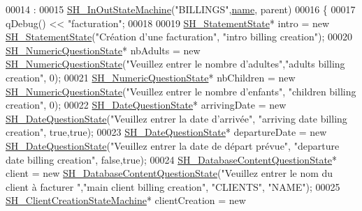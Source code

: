 \begin{DoxyCode}
00014                                                                                             :
00015     \hyperlink{classSH__InOutStateMachine_abd780037922920c674b43d80c2b50d16}{SH\_InOutStateMachine}(\textcolor{stringliteral}{"BILLINGS"},\hyperlink{classSH__NamedObject_a970f265df31b28b2179bbbceb6170ac2}{name}, parent)
00016 \{
00017     qDebug() << \textcolor{stringliteral}{"facturation"};
00018 
00019     \hyperlink{classSH__StatementState}{SH\_StatementState}* intro = \textcolor{keyword}{new} \hyperlink{classSH__StatementState}{SH\_StatementState}(\textcolor{stringliteral}{"Création d'une
       facturation"}, \textcolor{stringliteral}{"intro billing creation"});
00020     \hyperlink{classSH__NumericQuestionState}{SH\_NumericQuestionState}* nbAdults = \textcolor{keyword}{new} 
      \hyperlink{classSH__NumericQuestionState}{SH\_NumericQuestionState}(\textcolor{stringliteral}{"Veuillez entrer le nombre d'adultes"},\textcolor{stringliteral}{"adults billing
       creation"}, 0);
00021     \hyperlink{classSH__NumericQuestionState}{SH\_NumericQuestionState}* nbChildren = \textcolor{keyword}{new} 
      \hyperlink{classSH__NumericQuestionState}{SH\_NumericQuestionState}(\textcolor{stringliteral}{"Veuillez entrer le nombre d'enfants"}, \textcolor{stringliteral}{"children billing
       creation"}, 0);
00022     \hyperlink{classSH__DateQuestionState}{SH\_DateQuestionState}* arrivingDate = \textcolor{keyword}{new} 
      \hyperlink{classSH__DateQuestionState}{SH\_DateQuestionState}(\textcolor{stringliteral}{"Veuillez entrer la date d'arrivée"}, \textcolor{stringliteral}{"arriving date billing
       creation"}, \textcolor{keyword}{true},\textcolor{keyword}{true});
00023     \hyperlink{classSH__DateQuestionState}{SH\_DateQuestionState}* departureDate = \textcolor{keyword}{new} 
      \hyperlink{classSH__DateQuestionState}{SH\_DateQuestionState}(\textcolor{stringliteral}{"Veuillez entrer la date de départ prévue"}, \textcolor{stringliteral}{"departure date
       billing creation"}, \textcolor{keyword}{false},\textcolor{keyword}{true});
00024     \hyperlink{classSH__DatabaseContentQuestionState}{SH\_DatabaseContentQuestionState}* client = \textcolor{keyword}{new} 
      \hyperlink{classSH__DatabaseContentQuestionState}{SH\_DatabaseContentQuestionState}(\textcolor{stringliteral}{"Veuillez entrer le nom du client à facturer
      "},\textcolor{stringliteral}{"main client billing creation"}, \textcolor{stringliteral}{"CLIENTS"}, \textcolor{stringliteral}{"NAME"});
00025     \hyperlink{classSH__ClientCreationStateMachine}{SH\_ClientCreationStateMachine}* clientCreation = \textcolor{keyword}{new} 

\end{DoxyCode}
